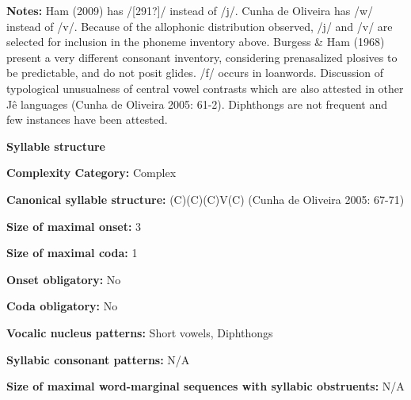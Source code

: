 \begin{styleBody}
\textbf{Notes:} Ham (2009) has /[291?]/ instead of /j/. Cunha de Oliveira has /w/ instead of /v/. Because of the allophonic distribution observed, /j/ and /v/ are selected for inclusion in the phoneme inventory above. Burgess \& Ham (1968) present a very different consonant inventory, considering prenasalized plosives to be predictable, and do not posit glides. /f/ occurs in loanwords. Discussion of typological unusualness of central vowel contrasts which are also attested in other Jê languages (Cunha de Oliveira 2005: 61-2). Diphthongs are not frequent and few instances have been attested.
\end{styleBody}

\begin{styleBody}
\textbf{Syllable structure}
\end{styleBody}

\begin{styleBody}
\textbf{Complexity Category:} Complex
\end{styleBody}

\begin{styleBody}
\textbf{Canonical syllable structure:} (C)(C)(C)V(C)\textbf{ }(Cunha de Oliveira 2005: 67-71)
\end{styleBody}

\begin{styleBody}
\textbf{Size of maximal onset:} 3
\end{styleBody}

\begin{styleBody}
\textbf{Size of maximal coda:} 1
\end{styleBody}

\begin{styleBody}
\textbf{Onset obligatory:} No
\end{styleBody}

\begin{styleBody}
\textbf{Coda obligatory:} No
\end{styleBody}

\begin{styleBody}
\textbf{Vocalic nucleus patterns:} Short vowels, Diphthongs
\end{styleBody}

\begin{styleBody}
\textbf{Syllabic consonant patterns:} N/A
\end{styleBody}

\begin{styleBody}
\textbf{Size of maximal word{}-marginal sequences with syllabic obstruents:} N/A
\end{styleBody}

